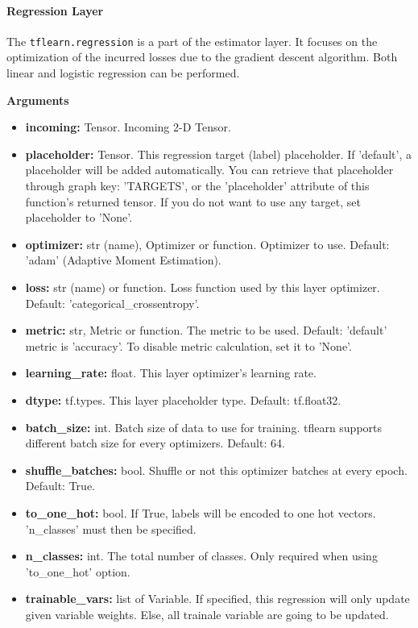 \documentclass[conference,compsoc]{IEEEtran}
\begin{document}
\paragraph{Regression Layer}

The \texttt{tflearn.regression} is a part of the estimator layer. It focuses on the optimization of the incurred losses due to the gradient descent algorithm. Both linear and logistic regression can be performed.

\textbf{Arguments}

\begin{itemize}
    \item \textbf{incoming:} Tensor. Incoming 2-D Tensor.
    \item \textbf{placeholder:} Tensor. This regression target (label) placeholder. If 'default', a placeholder will be added automatically. You can retrieve that placeholder through graph key: 'TARGETS', or the 'placeholder' attribute of this function's returned tensor. If you do not want to use any target, set placeholder to 'None'.
    \item \textbf{optimizer:} str (name), Optimizer or function. Optimizer to use. Default: 'adam' (Adaptive Moment Estimation).
    \item \textbf{loss:} str (name) or function. Loss function used by this layer optimizer. Default: 'categorical\_crossentropy'.
    \item \textbf{metric:} str, Metric or function. The metric to be used. Default: 'default' metric is 'accuracy'. To disable metric calculation, set it to 'None'.
    \item \textbf{learning\_rate:} float. This layer optimizer's learning rate.
    \item \textbf{dtype:} tf.types. This layer placeholder type. Default: tf.float32.
    \item \textbf{batch\_size:} int. Batch size of data to use for training. tflearn supports different batch size for every optimizers. Default: 64.
    \item \textbf{shuffle\_batches:} bool. Shuffle or not this optimizer batches at every epoch. Default: True.
    \item \textbf{to\_one\_hot:} bool. If True, labels will be encoded to one hot vectors. 'n\_classes' must then be specified.
    \item \textbf{n\_classes:} int. The total number of classes. Only required when using 'to\_one\_hot' option.
    \item \textbf{trainable\_vars:} list of Variable. If specified, this regression will only update given variable weights. Else, all trainale variable are going to be updated.

\end{itemize}
\end{document}
